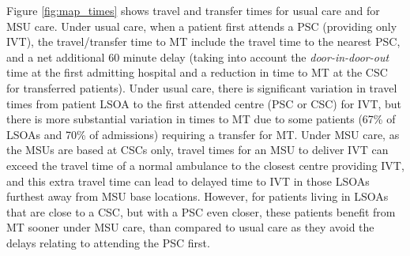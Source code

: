 Figure \ref{fig:map_times} shows travel and transfer times for usual care and for MSU care. Under usual care, when a patient first attends a PSC (providing only IVT), the travel/transfer time to MT include the travel time to the nearest PSC, and a net additional 60 minute delay (taking into account the \textit{door-in-door-out} time at the first admitting hospital and a reduction in time to MT at the CSC for transferred patients). Under usual care, there is significant variation in travel times from patient LSOA to the first attended centre (PSC or CSC) for IVT, but there is more substantial variation in times to MT due to some patients (67\% of LSOAs and 70\% of admissions) requiring a transfer for MT. Under MSU care, as the MSUs are based at CSCs only, travel times for an MSU to deliver IVT can exceed the travel time of a normal ambulance to the closest centre providing IVT, and this extra travel time can lead to delayed time to IVT in those LSOAs furthest away from MSU base locations. However, for patients living in LSOAs that are close to a CSC, but with a PSC even closer, these patients benefit from MT sooner under MSU care, than compared to usual care as they avoid the delays relating to attending the PSC first.

